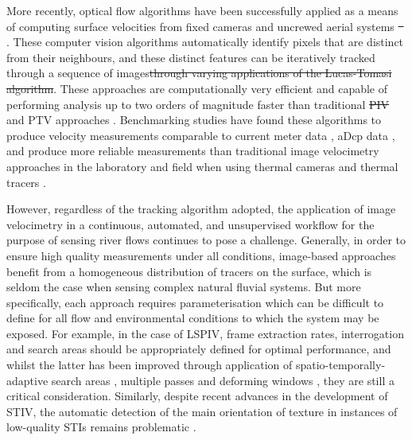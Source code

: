 \documentclass[hess, manuscript]{copernicus} %
\providecommand{\DIFadd}[1]{{\protect\color{blue}\uwave{#1}}} %
\providecommand{\DIFdel}[1]{{\protect\color{red}\sout{#1}}} %
\providecommand{\DIFaddbegin}{} %
\providecommand{\DIFaddend}{} %
\providecommand{\DIFdelbegin}{} %
\providecommand{\DIFdelend}{} %
\newcommand{\DIFscaledelfig}{0.5}
\newlength{\DIFdelgraphicswidth} %
\newlength{\DIFdelgraphicsheight} %
\newcommand{\DIFaddincludegraphics}[2][]{{\color{blue}\fbox{\DIFOincludegraphics[#1]{#2}}}} %
\newcommand{\DIFdelincludegraphics}[2][]{%
\sbox{\DIFdelgraphicsbox}{\DIFOincludegraphics[#1]{#2}}%
\settoboxwidth{\DIFdelgraphicswidth}{\DIFdelgraphicsbox} %
\settoboxtotalheight{\DIFdelgraphicsheight}{\DIFdelgraphicsbox} %
\scalebox{\DIFscaledelfig}{%
\parbox[b]{\DIFdelgraphicswidth}{\usebox{\DIFdelgraphicsbox}\\[-\baselineskip] \rule{\DIFdelgraphicswidth}{0em}}\llap{\resizebox{\DIFdelgraphicswidth}{\DIFdelgraphicsheight}{%
\setlength{\unitlength}{\DIFdelgraphicswidth}%
\begin{picture}(1,1)%
\thicklines\linethickness{2pt} %
{\color[rgb]{1,0,0}\put(0,0){\framebox(1,1){}}}%
{\color[rgb]{1,0,0}\put(0,0){\line( 1,1){1}}}%
{\color[rgb]{1,0,0}\put(0,1){\line(1,-1){1}}}%
\end{picture}%
}\hspace*{3pt}}} %
} %
\DeclareRobustCommand{\DIFaddbegin}{\DIFOaddbegin \let\includegraphics\DIFaddincludegraphics} %
\DeclareRobustCommand{\DIFaddend}{\DIFOaddend \let\includegraphics\DIFOincludegraphics} %
\DeclareRobustCommand{\DIFdelbegin}{\DIFOdelbegin \let\includegraphics\DIFdelincludegraphics} %
\DeclareRobustCommand{\DIFdelend}{\DIFOaddend \let\includegraphics\DIFOincludegraphics} %
\begin{document}
More recently, optical flow algorithms have been successfully applied as a means of computing surface velocities from fixed cameras \citep{Tauro2018b, Lin2019, Khalid2019} and uncrewed aerial systems \DIFdelbegin \DIFdel{\mbox{%
\citep{Perks2016}}\hskip0pt%
}\DIFdelend \DIFaddbegin \DIFadd{\mbox{%
\citep{Perks2016, eltner2020}}\hskip0pt%
}\DIFaddend . These computer vision algorithms \DIFaddbegin \DIFadd{e.g. Kande-Lucas-Tomasi algorithm \mbox{%
\citep{Lucas1981, Tomasi1991, Shi1994}}\hskip0pt%
, }\DIFaddend automatically identify pixels that are distinct from their neighbours, and these distinct features can be iteratively tracked through a sequence of images\DIFdelbegin \DIFdel{through varying applications of the Lucas-Tomasi algorithm}\DIFdelend . These approaches are computationally very efficient and capable of performing analysis up to two orders of magnitude faster than traditional \DIFdelbegin \DIFdel{PIV }\DIFdelend \DIFaddbegin \DIFadd{LSPIV }\DIFaddend and PTV approaches \citep{Tauro2018b}. Benchmarking studies have found these algorithms to produce velocity measurements comparable to current meter data \citep{Tauro2018b}, aDcp data \citep{Pearce2020}, and produce more reliable measurements than traditional image velocimetry approaches in the laboratory and field when using thermal cameras and thermal tracers \citep{Lin2019}. 

However, regardless of the tracking algorithm adopted, the application of image velocimetry in a continuous, automated, and unsupervised workflow for the purpose of sensing river flows continues to pose a challenge. Generally, in order to ensure high quality measurements under all conditions, image-based approaches benefit from a homogeneous distribution of tracers on the \DIFaddbegin \DIFadd{water }\DIFaddend surface, which is seldom the case when sensing complex natural fluvial systems. But more specifically, each approach requires parameterisation which can be difficult to define for all flow and environmental conditions to which the system may be exposed. For example, in the case of LSPIV, frame extraction rates, interrogation and search areas should be appropriately defined for optimal performance, and whilst the latter has been improved through application of spatio-temporally-adaptive search areas \citep{Fleit2019}, multiple passes and deforming windows \citep[e.g.,][]{Thielicke2021}, they are still a critical consideration. Similarly, despite recent advances in the development of STIV, the automatic detection of the main orientation of texture in instances of low-quality STIs remains problematic \citep{Wang2024}.
\end{document}
